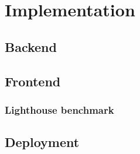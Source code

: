 \section{Implementation}

\subsection{Backend}

\subsection{Frontend}

\subsubsection{Lighthouse benchmark}




\subsection{Deployment}